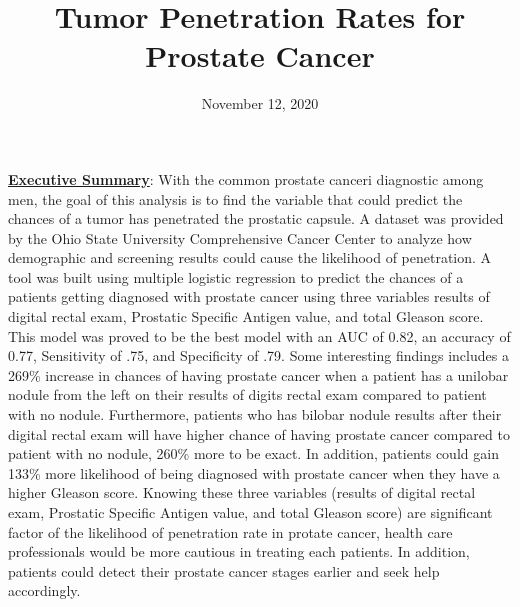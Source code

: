 \documentclass[11pt]{article}\usepackage[]{graphicx}\usepackage[]{color}
\title{Tumor Penetration Rates for Prostate Cancer\vspace{-5ex}}
\date{November 12, 2020\vspace{-5ex}}
\begin{document}
 
\maketitle
\hfill \break


















\noindent\textbf{\underline{Executive Summary}}: With the common prostate canceri diagnostic among men, the goal of this analysis is to find the variable that could predict the chances of a tumor has penetrated the prostatic capsule. A dataset was provided by the Ohio State University Comprehensive Cancer Center to analyze how demographic and screening results could cause the likelihood of penetration. A tool was built using multiple logistic regression to predict the chances of a patients getting diagnosed with prostate cancer using three variables results of digital rectal exam, Prostatic Specific Antigen value, and total Gleason score. This model was proved to be the best model with an AUC of 0.82, an accuracy of 0.77, Sensitivity of .75, and Specificity of .79. Some interesting findings includes a 269\% increase in chances of having prostate cancer when a patient has a unilobar nodule from the left on their results of digits rectal exam compared to patient with no nodule. Furthermore, patients who has bilobar nodule results after their digital rectal exam will have higher chance of having prostate cancer compared to patient with no nodule, 260\% more to be exact. In addition, patients could gain 133\% more likelihood of being diagnosed with prostate cancer when they have a higher Gleason score. Knowing these three variables (results of digital rectal exam, Prostatic Specific Antigen value, and total Gleason score) are significant factor of the likelihood of penetration rate in protate cancer, health care professionals would be more cautious in treating each patients. In addition, patients could detect their prostate cancer stages earlier and seek help accordingly.      
\hfill \break
\end{document}
